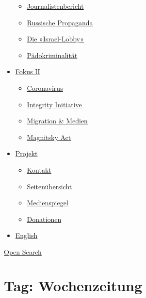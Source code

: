 \begin{itemize}
  \begin{itemize}
  \tightlist
  \item
    \href{https://swprs.org/bericht-eines-journalisten/}{Journalistenbericht}
  \item
    \href{https://swprs.org/russische-propaganda/}{Russische Propaganda}
  \item
    \href{https://swprs.org/die-israel-lobby-fakten-und-mythen/}{Die
    »Israel-Lobby«}
  \item
    \href{https://swprs.org/geopolitik-und-paedokriminalitaet/}{Pädokriminalität}
  \end{itemize}
\item
  \href{https://swprs.org/migration-und-medien/}{Fokus II}

  \begin{itemize}
  \tightlist
  \item
    \href{https://swprs.org/covid-19-hinweis-ii/}{Coronavirus}
  \item
    \href{https://swprs.org/die-integrity-initiative/}{Integrity
    Initiative}
  \item
    \href{https://swprs.org/migration-und-medien/}{Migration \& Medien}
  \item
    \href{https://swprs.org/der-fall-magnitsky/}{Magnitsky Act}
  \end{itemize}
\item
  \href{https://swprs.org/kontakt/}{Projekt}

  \begin{itemize}
  \tightlist
  \item
    \href{https://swprs.org/kontakt/}{Kontakt}
  \item
    \href{https://swprs.org/uebersicht/}{Seitenübersicht}
  \item
    \href{https://swprs.org/medienspiegel/}{Medienspiegel}
  \item
    \href{https://swprs.org/donationen/}{Donationen}
  \end{itemize}
\item
  \href{https://swprs.org/contact/}{English}
\end{itemize}

\protect\hyperlink{}{Open Search}

\hypertarget{tag-wochenzeitung}{%
\section{Tag: Wochenzeitung}\label{tag-wochenzeitung}}

